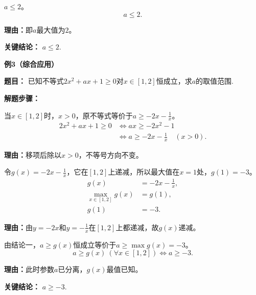 \begin{examplebox}
\begin{description}[style=nextline, leftmargin=2.8em, labelsep=0.5em, itemsep=0.45em]
		\item[\textbf{第三步（写出范围）：}] $a\le 2$。
			\[
				a\le 2.
			\]
			\par\textbf{理由：}即$a$最大值为$2$。
	\end{description}
	\textbf{\textcolor{CExample}{关键结论：}}
	\textbf{$a\le 2$}.

	\medskip
	\textbf{\textcolor{CExample}{例3（综合应用）}}

	\textbf{\textcolor{CExample}{题目：}}
	已知不等式$2x^2+ax+1\ge0$对$x\in[1,2]$恒成立，求$a$的取值范围.

	\textbf{\textcolor{CExample}{解题步骤：}}
	\begin{description}[style=nextline, leftmargin=2.8em, labelsep=0.5em, itemsep=0.45em]
		\item[\textbf{第一步（分离参数）：}] 当$x\in[1,2]$时，$x>0$，原不等式等价于$a\ge -2x-\frac{1}{x}$。
			\[
				\begin{aligned}
					2x^2+ax+1\ge0 &\iff ax\ge -2x^2-1 \\
					&\iff a\ge -2x-\frac{1}{x}\quad (x>0).
			\end{aligned}
			\]
			\par\textbf{理由：}移项后除以$x>0$，不等号方向不变。

		\item[\textbf{第二步（求最值）：}] 令$g(x)=-2x-\frac{1}{x}$，它在$[1,2]$上递减，所以最大值在$x=1$处，$g(1)=-3$。
			\[
				\begin{aligned}
					g(x) &= -2x - \frac{1}{x}, \\
					\max_{x\in[1,2]}g(x) &= g(1), \\
					g(1) &= -3.
			\end{aligned}
			\]
			\par\textbf{理由：}由$y=-2x$和$y=-\frac{1}{x}$在$[1,2]$上都递减，故$g(x)$递减。

		\item[\textbf{第三步（套用结论一）：}] 由结论一，$a\ge g(x)$恒成立等价于$a\ge \max g(x)=-3$。
			\[
				a\ge g(x)\ (\forall x\in[1,2]) \iff a\ge -3.
			\]
			\par\textbf{理由：}此时参数$a$已分离，$g(x)$最值已知。
	\end{description}
	\textbf{\textcolor{CExample}{关键结论：}}
	\textbf{$a\ge -3$}.
\end{examplebox}
